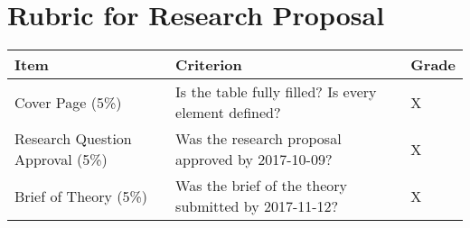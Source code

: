 \documentclass[11pt,]{article}
\theoremstyle{definition}
\theoremstyle{definition}
\theoremstyle{remark}
\begin{document}
\clearpage

\hypertarget{id}{\section{Rubric for Research Proposal}\label{id}}

\begin{longtable}[]{@{}lll@{}}
\toprule
\begin{minipage}[b]{0.12\columnwidth}\raggedright\strut
Item\strut
\end{minipage} & \begin{minipage}[b]{0.76\columnwidth}\raggedright\strut
Criterion\strut
\end{minipage} & \begin{minipage}[b]{0.03\columnwidth}\raggedright\strut
Grade\strut
\end{minipage}\tabularnewline
\midrule
\endhead
\begin{minipage}[t]{0.12\columnwidth}\raggedright\strut
Cover Page (5\%)\strut
\end{minipage} & \begin{minipage}[t]{0.76\columnwidth}\raggedright\strut
Is the table fully filled? Is every element defined?\strut
\end{minipage} & \begin{minipage}[t]{0.03\columnwidth}\raggedright\strut
X\strut
\end{minipage}\tabularnewline
\begin{minipage}[t]{0.12\columnwidth}\raggedright\strut
Research Question Approval (5\%)\strut
\end{minipage} & \begin{minipage}[t]{0.76\columnwidth}\raggedright\strut
Was the research proposal approved by 2017-10-09?\strut
\end{minipage} & \begin{minipage}[t]{0.03\columnwidth}\raggedright\strut
X\strut
\end{minipage}\tabularnewline
\begin{minipage}[t]{0.12\columnwidth}\raggedright\strut
Brief of Theory (5\%)\strut
\end{minipage} & \begin{minipage}[t]{0.76\columnwidth}\raggedright\strut
Was the brief of the theory submitted by 2017-11-12?\strut
\end{minipage} & \begin{minipage}[t]{0.03\columnwidth}\raggedright\strut
X\strut
\end{minipage}\tabularnewline

\end{longtable}
\end{document}
